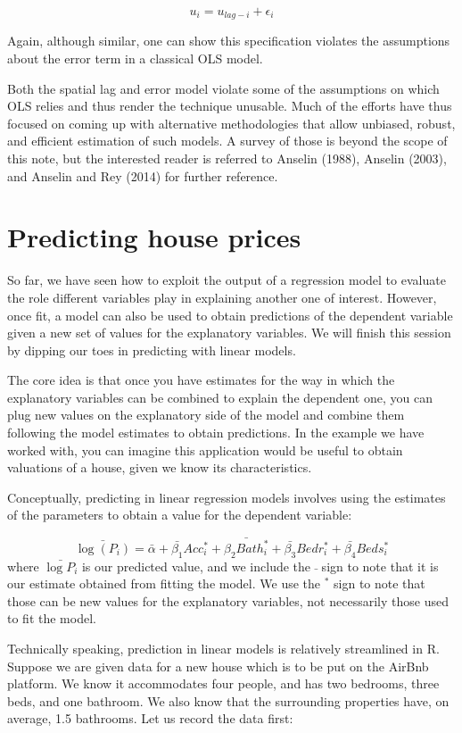 \documentclass[
  letterpaper,
  krantz2]{style/krantz}
\begin{document}
\[
u_i = u_{lag-i} + \epsilon_i
\]

Again, although similar, one can show this specification violates the
assumptions about the error term in a classical OLS model.

Both the spatial lag and error model violate some of the assumptions on
which OLS relies and thus render the technique unusable. Much of the
efforts have thus focused on coming up with alternative methodologies
that allow unbiased, robust, and efficient estimation of such models. A
survey of those is beyond the scope of this note, but the interested
reader is referred to Anselin (1988), Anselin (2003), and Anselin and
Rey (2014) for further reference.

\hypertarget{predicting-house-prices}{%
\section{Predicting house prices}\label{predicting-house-prices}}

So far, we have seen how to exploit the output of a regression model to
evaluate the role different variables play in explaining another one of
interest. However, once fit, a model can also be used to obtain
predictions of the dependent variable given a new set of values for the
explanatory variables. We will finish this session by dipping our toes
in predicting with linear models.

The core idea is that once you have estimates for the way in which the
explanatory variables can be combined to explain the dependent one, you
can plug new values on the explanatory side of the model and combine
them following the model estimates to obtain predictions. In the example
we have worked with, you can imagine this application would be useful to
obtain valuations of a house, given we know its characteristics.

Conceptually, predicting in linear regression models involves using the
estimates of the parameters to obtain a value for the dependent
variable:

\[
\bar{\log(P_i)} = \bar{\alpha} + \bar{\beta_1} Acc_i^* + \bar{\beta_2 Bath_i^*} + \bar{\beta_3} Bedr_i^* + \bar{\beta_4} Beds_i^*
\] where \(\bar{\log{P_i}}\) is our predicted value, and we include the
\(\bar{}\) sign to note that it is our estimate obtained from fitting
the model. We use the \(^*\) sign to note that those can be new values
for the explanatory variables, not necessarily those used to fit the
model.

Technically speaking, prediction in linear models is relatively
streamlined in R. Suppose we are given data for a new house which is to
be put on the AirBnb platform. We know it accommodates four people, and
has two bedrooms, three beds, and one bathroom. We also know that the
surrounding properties have, on average, 1.5 bathrooms. Let us record
the data first:
\end{document}
